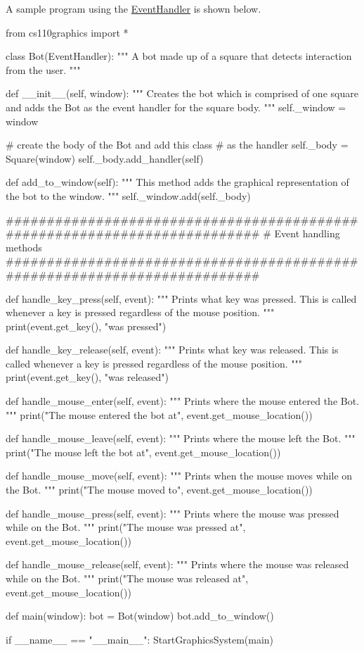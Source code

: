 A sample program using the \hyperlink{classcs110graphics_1_1EventHandler}{EventHandler} is shown below. 
\begin{DoxyCode}
 from cs110graphics import *

 class Bot(EventHandler):
     """ A bot made up of a square that detects interaction from the user. """

     def __init__(self, window):
         """ Creates the bot which is comprised of one square and adds the Bot
         as the event handler for the square body. """
         self._window = window

         # create the body of the Bot and add this class
         # as the handler
         self._body = Square(window)
         self._body.add_handler(self)

     def add_to_window(self):
         """ This method adds the graphical representation of the bot
         to the window. """
         self._window.add(self._body)

     ##########################################################################
     # Event handling methods                                                  
     ##########################################################################

     def handle_key_press(self, event):
         """ Prints what key was pressed. This is called whenever a key is
         pressed regardless of the mouse position. """
         print(event.get_key(), "was pressed")

     def handle_key_release(self, event):
         """ Prints what key was released. This is called whenever a key is
         pressed regardless of the mouse position. """
         print(event.get_key(), "was released")

     def handle_mouse_enter(self, event):
         """ Prints where the mouse entered the Bot. """
         print("The mouse entered the bot at", event.get_mouse_location())

     def handle_mouse_leave(self, event):
         """ Prints where the mouse left the Bot. """
         print("The mouse left the bot at", event.get_mouse_location())

     def handle_mouse_move(self, event):
         """ Prints when the mouse moves while on the Bot. """
         print("The mouse moved to", event.get_mouse_location())

     def handle_mouse_press(self, event):
         """ Prints where the mouse was pressed while on the Bot. """
         print("The mouse was pressed at", event.get_mouse_location())

     def handle_mouse_release(self, event):
         """ Prints where the mouse was released while on the Bot. """
         print("The mouse was released at", event.get_mouse_location())

 def main(window):
     bot = Bot(window)
     bot.add_to_window()

 if __name__ == "__main__":
     StartGraphicsSystem(main)
\end{DoxyCode}
 

